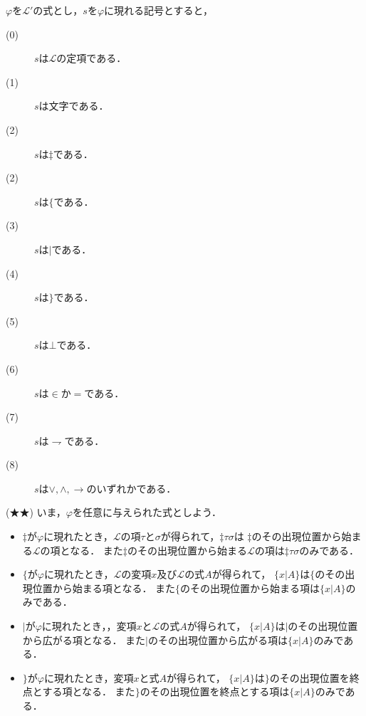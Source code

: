 \documentclass[a4j,10.5pt,oneside,openany]{jsbook}
\begin{document}
	$\varphi$を$\mathcal{L}'$の式とし，$s$を$\varphi$に現れる記号とすると，
	\begin{description}
		\item[(0)] $s$は$\mathcal{L}$の定項である．
		\item[(1)] $s$は文字である．
		\item[(2)] $s$は$\ddagger$である．
		\item[(2)] $s$は$\{$である．
		\item[(3)] $s$は$|$である．
		\item[(4)] $s$は$\}$である．
		\item[(5)] $s$は$\bot$である．
		\item[(6)] $s$は$\in$か$=$である．
		\item[(7)] $s$は$\rightharpoondown$である．
		\item[(8)] $s$は$\vee,\wedge,\rightarrow$のいずれかである．
	\end{description}
	
	\begin{screen}
		(★★) いま，$\varphi$を任意に与えられた式としよう．
		\begin{itemize}
			\item $\ddagger$が$\varphi$に現れたとき，$\mathcal{L}$の項$\tau$と$\sigma$が得られて，$\ddagger \tau \sigma$は
				$\ddagger$のその出現位置から始まる$\mathcal{L}$の項となる．
				また$\ddagger$のその出現位置から始まる$\mathcal{L}$の項は$\ddagger \tau \sigma$のみである．
				
			\item $\{$が$\varphi$に現れたとき，$\mathcal{L}$の変項$x$及び$\mathcal{L}$の式$A$が得られて，
				$\{ x|A\}$は$\{$のその出現位置から始まる項となる．
				また$\{$のその出現位置から始まる項は$\{x|A\}$のみである．
				
			\item $|$が$\varphi$に現れたとき，，変項$x$と$\mathcal{L}$の式$A$が得られて，
				$\{x|A\}$は$|$のその出現位置から広がる項となる．
				また$|$のその出現位置から広がる項は$\{x|A\}$のみである．
				
			\item $\}$が$\varphi$に現れたとき，変項$x$と式$A$が得られて，
				$\{x|A\}$は$\}$のその出現位置を終点とする項となる．
				また$\}$のその出現位置を終点とする項は$\{x|A\}$のみである．
		\end{itemize}
	\end{screen}
	
\end{document}
